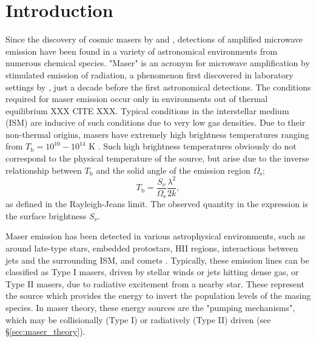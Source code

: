 \section{Introduction}
\label{sec:intro}

Since the discovery of cosmic masers by \citet{gundermann1965} and \citet{WEAVER_1965}, detections of amplified microwave emission have been found in a variety of astronomical environments from numerous chemical species. "Maser" is an acronym for microwave amplification by stimulated emission of radiation, a phenomenon first discovered in laboratory settings by \cite{Gordon_1955}, just a decade before the first astronomical detections. The conditions required for maser emission occur only in environments out of thermal equilibrium XXX CITE XXX. Typical conditions in the interstellar medium (ISM) are inducive of such conditions due to very low gas densities. Due to their non-thermal origins, masers have extremely high brightness temperatures ranging from $T_{\mathrm{b}} = 10^{10}-10^{14}$ K \citep{lo2005}. Such high brightness temperatures obviously do not correspond to the physical temperature of the source, but arise due to the inverse relationship between $T_{\mathrm{b}}$ and the solid angle of the emission region $\Omega_{\mathrm{s}}$;
\begin{equation}
\label{eq:temp_bright}
T_{\mathrm{b}} = \frac{S_\nu}{\Omega_{\mathrm{s}}} \frac{\lambda^2}{2k},
\end{equation}
as defined in the Rayleigh-Jeans limit. The observed quantity in the expression is the surface brightness $S_\nu$.

Maser emission has been detected in various astrophysical environments, such as around late-type stars, embedded protostars, HII regions, interactions between jets and the surrounding ISM, and comets \citep{lo2005}. Typically, these emission lines can be classified as Type I masers, driven by stellar winds or jets hitting dense gas, or Type II masers, due to radiative excitement from a nearby star. These represent the source which provides the energy to invert the population levels of the masing species. In maser theory, these energy sources are the "pumping mechanisms", which may be collisionally (Type I) or radiatively (Type II) driven (see \S\ref{sec:maser_theory}).

